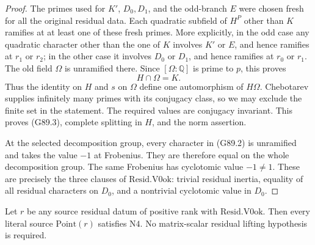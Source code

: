 \begin{proof}
The primes used for \(K'\), \(D_0,D_1\), and the odd-branch \(E\)
were chosen fresh for all the original residual data.
Each quadratic subfield of \(H^P\) other than \(K\) ramifies
at at least one of these fresh primes.
More explicitly, in the odd case any quadratic character other
than the one of \(K\) involves \(K'\) or \(E\), and hence ramifies
at \(r_1\) or \(r_2\); in the other case it involves \(D_0\) or
\(D_1\), and hence ramifies at \(r_0\) or \(r_1\).
The old field \(\Omega\) is unramified there.
Since \([\Omega:\mathbb Q]\) is prime to \(p\), this proves
\[
                         H\cap\Omega=K.           \tag{G89.8}
\]
Thus the identity on \(H\) and \(s\) on \(\Omega\) define one
automorphism of \(H\Omega\).
Chebotarev supplies infinitely many primes with its conjugacy
class, so we may exclude the finite set in the statement.
The required values are conjugacy invariant.  This proves
(G89.3), complete splitting in \(H\), and the norm assertion.

At the selected decomposition group, every character in (G89.2)
is unramified and takes the value \(-1\) at Frobenius.
They are therefore equal on the whole decomposition group.
The same Frobenius has cyclotomic value \(-1\ne1\).
These are precisely the three clauses of
\(\mathrm{Resid.V0ok}\): trivial residual inertia, equality of all
residual characters on \(D_0\), and a nontrivial cyclotomic
value in \(D_0\).
\end{proof}

\begin{lemma}
\label{lem:G89-N4}
Let \(r\) be any source residual datum of positive rank with
\(\mathrm{Resid.V0ok}\).  Then every literal source
\(\mathrm{Point}(r)\) satisfies \(\mathrm{N4}\).
No matrix-scalar residual lifting hypothesis is required.
\end{lemma}


